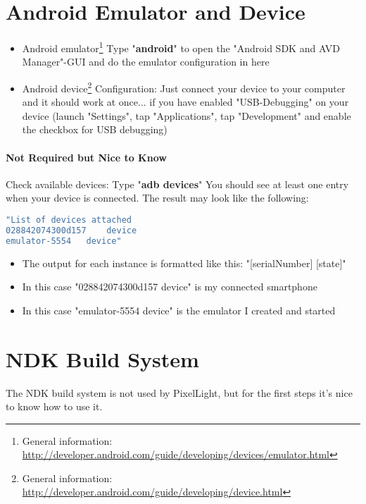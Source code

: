 \section{Android Emulator and Device}
\begin{itemize}
\item{Android emulator\footnote{General information: \url{http://developer.android.com/guide/developing/devices/emulator.html}} \textrightarrow{} Type "\textbf{android}" to open the "Android SDK and AVD Manager"-\ac{GUI} and do the emulator configuration in here}
\item{Android device\footnote{General information: \url{http://developer.android.com/guide/developing/device.html}} \textrightarrow{} Configuration: Just connect your device to your computer and it should work at once... if you have enabled "USB-Debugging" on your device (launch "Settings", tap "Applications", tap "Development" and enable the checkbox for USB debugging)}
\end{itemize}


\paragraph{Not Required but Nice to Know}
Check available devices: Type "\textbf{adb devices}" \textrightarrow{} You should see at least one entry when your device is connected. The result may look like the following:
\begin{lstlisting}[language=sh]
"List of devices attached
028842074300d157	device
emulator-5554	device"
\end{lstlisting}

\begin{itemize}
\item{The output for each instance is formatted like this: \textrightarrow{} "[serialNumber] [state]"}
\item{In this case "028842074300d157	device" is my connected smartphone}
\item{In this case "emulator-5554	device" is the emulator I created and started}
\end{itemize}




\section{\ac{NDK} Build System}
The \ac{NDK} build system is not used by PixelLight, but for the first steps it's nice to know how to use it.

